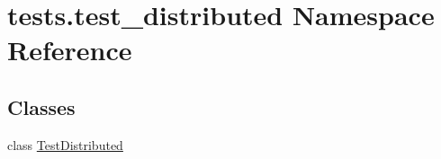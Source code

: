 \hypertarget{namespacetests_1_1test__distributed}{}\section{tests.\+test\+\_\+distributed Namespace Reference}
\label{namespacetests_1_1test__distributed}
\subsection*{Classes}
\begin{DoxyCompactItemize}
\item 
class \hyperlink{classtests_1_1test__distributed_1_1TestDistributed}{Test\+Distributed}
\end{DoxyCompactItemize}
